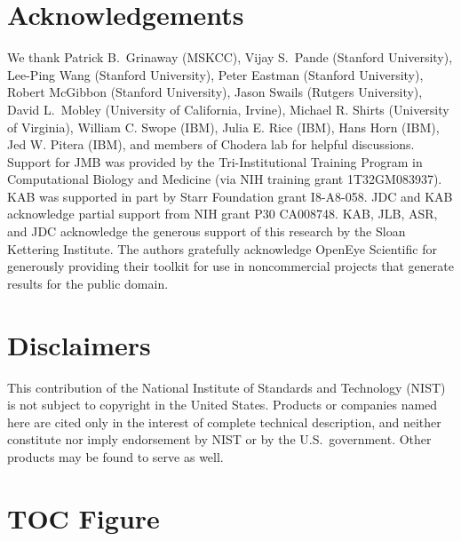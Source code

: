 \documentclass[aip, jcp, reprint]{revtex4-1}  %
\begin{document}

\section{Acknowledgements}

We thank Patrick B.~Grinaway (MSKCC), Vijay S.~Pande (Stanford University), Lee-Ping Wang (Stanford University), Peter Eastman (Stanford University), Robert McGibbon (Stanford University), Jason Swails (Rutgers University), David L.~Mobley (University of California, Irvine), Michael R. Shirts (University of Virginia), William C. Swope (IBM), Julia E. Rice (IBM), Hans Horn (IBM), Jed W. Pitera (IBM), and members of Chodera lab for helpful discussions.  
Support for JMB was provided by the Tri-Institutional Training Program in Computational Biology and Medicine (via NIH training grant 1T32GM083937).  
KAB was supported in part by Starr Foundation grant I8-A8-058.  
JDC and KAB acknowledge partial support from NIH grant P30 CA008748.  KAB, JLB, ASR, and JDC acknowledge the generous support of this research by the Sloan Kettering Institute.
The authors gratefully acknowledge OpenEye Scientific for generously providing their toolkit for use in noncommercial projects that generate results for the public domain.


\section{Disclaimers}

This contribution of the National Institute of Standards and Technology (NIST) is not subject to copyright in the United States.  
Products or companies named here are cited only in the interest of complete technical description, and neither constitute nor imply endorsement by NIST or by the U.S.~government.  
Other products may be found to serve as well.

\clearpage

\section{TOC Figure}
\end{document}
